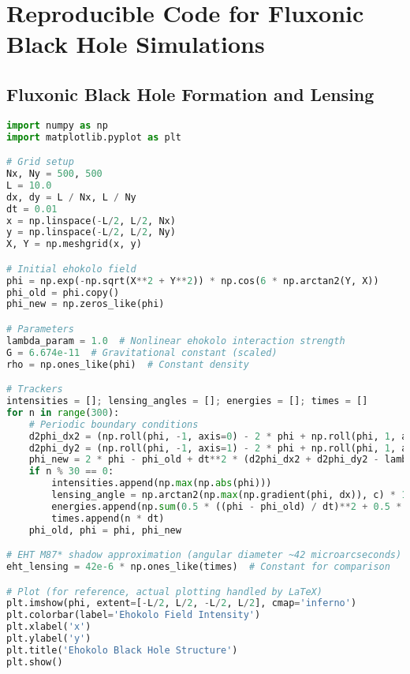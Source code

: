\documentclass{article}
\begin{document}
\section{Reproducible Code for Fluxonic Black Hole Simulations}
\subsection{Fluxonic Black Hole Formation and Lensing}
\begin{lstlisting}[language=Python, caption=Fluxonic Black Hole Formation and Lensing, label=lst:ehokolo_sim]
import numpy as np
import matplotlib.pyplot as plt

# Grid setup
Nx, Ny = 500, 500
L = 10.0
dx, dy = L / Nx, L / Ny
dt = 0.01
x = np.linspace(-L/2, L/2, Nx)
y = np.linspace(-L/2, L/2, Ny)
X, Y = np.meshgrid(x, y)

# Initial ehokolo field
phi = np.exp(-np.sqrt(X**2 + Y**2)) * np.cos(6 * np.arctan2(Y, X))
phi_old = phi.copy()
phi_new = np.zeros_like(phi)

# Parameters
lambda_param = 1.0  # Nonlinear ehokolo interaction strength
G = 6.674e-11  # Gravitational constant (scaled)
rho = np.ones_like(phi)  # Constant density

# Trackers
intensities = []; lensing_angles = []; energies = []; times = []
for n in range(300):
    # Periodic boundary conditions
    d2phi_dx2 = (np.roll(phi, -1, axis=0) - 2 * phi + np.roll(phi, 1, axis=0)) / dx**2
    d2phi_dy2 = (np.roll(phi, -1, axis=1) - 2 * phi + np.roll(phi, 1, axis=1)) / dy**2
    phi_new = 2 * phi - phi_old + dt**2 * (d2phi_dx2 + d2phi_dy2 - lambda_param * phi**3 + 8 * np.pi * G * rho)
    if n % 30 == 0:
        intensities.append(np.max(np.abs(phi)))
        lensing_angle = np.arctan2(np.max(np.gradient(phi, dx)), c) * 180 / np.pi  # Simplified lensing angle
        energies.append(np.sum(0.5 * ((phi - phi_old) / dt)**2 + 0.5 * (np.gradient(phi, dx)**2 + np.gradient(phi, dy)**2)))
        times.append(n * dt)
    phi_old, phi = phi, phi_new

# EHT M87* shadow approximation (angular diameter ~42 microarcseconds)
eht_lensing = 42e-6 * np.ones_like(times)  # Constant for comparison

# Plot (for reference, actual plotting handled by LaTeX)
plt.imshow(phi, extent=[-L/2, L/2, -L/2, L/2], cmap='inferno')
plt.colorbar(label='Ehokolo Field Intensity')
plt.xlabel('x')
plt.ylabel('y')
plt.title('Ehokolo Black Hole Structure')
plt.show()
\end{lstlisting}
\end{document}
